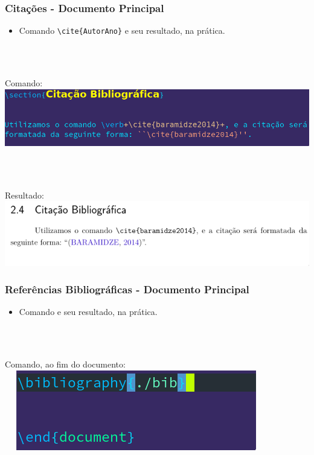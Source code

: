 \documentclass{beamer}
\begin{document}
	\begin{frame}[fragile]

	  \frametitle{Citações - Documento Principal}

	  \begin{itemize}
	  \item Comando \verb_\cite{AutorAno}_ e seu resultado, na prática.
	\end{itemize}

	\\~~

	\begin{center}
	  Comando: \\
	  \includegraphics[scale=0.30]{../Imagens/A2I111.png}

	  \\~~

	  Resultado: \\
	  \includegraphics[scale=0.40]{../Imagens/A2I112.png}
	\end{center}

	\end{frame}

	\begin{frame}[fragile]
	  \frametitle{Referências Bibliográficas - Documento Principal}
	  \begin{itemize}
	  \item Comando \verb__ e seu resultado, na prática.
	  \end{itemize}
	  \\~~
	\begin{center}
	  Comando, ao fim do documento:
	  \\~~
	  \includegraphics[scale=0.60]{../Imagens/A2I122.png}
	\end{center}

	\end{frame}
\end{document}
